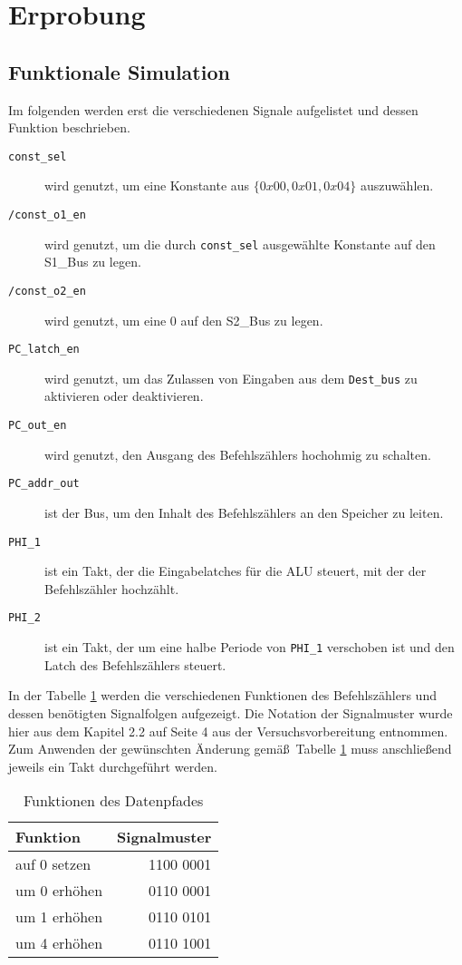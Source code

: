 \documentclass[12pt,a4paper]{scrartcl}
\begin{document}
\section{Erprobung}

\subsection{Funktionale Simulation}
Im folgenden werden erst die verschiedenen Signale aufgelistet und dessen Funktion beschrieben.
\begin{description}
\item [\texttt{const\_sel}] wird genutzt, um eine Konstante aus $\{0x00, 0x01, 0x04\}$ auszuw\"ahlen.
\item [\texttt{/const\_o1\_en}] wird genutzt, um die durch \texttt{const\_sel} ausgew\"ahlte Konstante auf den S1\_Bus zu legen.
\item [\texttt{/const\_o2\_en}] wird genutzt, um eine 0 auf den S2\_Bus zu legen.
\item [\texttt{PC\_latch\_en}] wird genutzt, um das Zulassen von Eingaben aus dem \texttt{Dest\_bus} zu aktivieren oder deaktivieren.
\item [\texttt{PC\_out\_en}] wird genutzt, den Ausgang des Befehlsz\"ahlers hochohmig zu schalten.
\item [\texttt{PC\_addr\_out}] ist der Bus, um den Inhalt des Befehlsz\"ahlers an den Speicher zu leiten.
\item [\texttt{PHI\_1}] ist ein Takt, der die Eingabelatches f\"ur die ALU steuert, mit der der Befehlsz\"ahler hochz\"ahlt.
\item [\texttt{PHI\_2}] ist ein Takt, der um eine halbe Periode von \texttt{PHI\_1} verschoben ist und den Latch des Befehlsz\"ahlers steuert.
\end{description}

In der Tabelle \ref{funktion} werden die verschiedenen Funktionen des Befehlsz\"ahlers und dessen ben\"otigten Signalfolgen aufgezeigt.
Die Notation der Signalmuster wurde hier aus dem Kapitel 2.2 auf Seite 4 aus der Versuchsvorbereitung entnommen.
Zum Anwenden der gew\"unschten \"Anderung gem\"a\ss \ Tabelle \ref{funktion} muss anschlie\ss end jeweils ein Takt durchgef\"uhrt werden.

\begin{table}[h]
    \centering
    \begin{tabular}{l|r}
    \hline
    Funktion       & Signalmuster \\
    \hline
    auf 0 setzen   & 1100 0001 \\
    um 0 erh\"ohen & 0110 0001 \\
    um 1 erh\"ohen & 0110 0101 \\
    um 4 erh\"ohen & 0110 1001 \\
    \hline
    \end{tabular}
    \caption{Funktionen des Datenpfades}
    \label{funktion}
\end{table}
\end{document}
